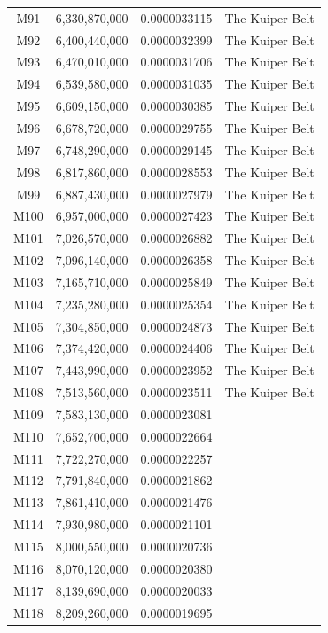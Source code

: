 \documentclass[11pt, a4paper]{article}
\begin{document}
\begin{longtable}{@{} c c c l @{}}
  M91 & 6,330,870,000 & 0.0000033115 & The Kuiper Belt \\
  M92 & 6,400,440,000 & 0.0000032399 & The Kuiper Belt \\
  M93 & 6,470,010,000 & 0.0000031706 & The Kuiper Belt \\
  M94 & 6,539,580,000 & 0.0000031035 & The Kuiper Belt \\
  M95 & 6,609,150,000 & 0.0000030385 & The Kuiper Belt \\
  M96 & 6,678,720,000 & 0.0000029755 & The Kuiper Belt \\
  M97 & 6,748,290,000 & 0.0000029145 & The Kuiper Belt \\
  M98 & 6,817,860,000 & 0.0000028553 & The Kuiper Belt \\
  M99 & 6,887,430,000 & 0.0000027979 & The Kuiper Belt \\
  M100 & 6,957,000,000 & 0.0000027423 & The Kuiper Belt \\
  M101 & 7,026,570,000 & 0.0000026882 & The Kuiper Belt \\
  M102 & 7,096,140,000 & 0.0000026358 & The Kuiper Belt \\
  M103 & 7,165,710,000 & 0.0000025849 & The Kuiper Belt \\
  M104 & 7,235,280,000 & 0.0000025354 & The Kuiper Belt \\
  M105 & 7,304,850,000 & 0.0000024873 & The Kuiper Belt \\
  M106 & 7,374,420,000 & 0.0000024406 & The Kuiper Belt \\
  M107 & 7,443,990,000 & 0.0000023952 & The Kuiper Belt \\
  M108 & 7,513,560,000 & 0.0000023511 & The Kuiper Belt \\
  M109 & 7,583,130,000 & 0.0000023081 &  \\
  M110 & 7,652,700,000 & 0.0000022664 &  \\
  M111 & 7,722,270,000 & 0.0000022257 &  \\
  M112 & 7,791,840,000 & 0.0000021862 &  \\
  M113 & 7,861,410,000 & 0.0000021476 &  \\
  M114 & 7,930,980,000 & 0.0000021101 &  \\
  M115 & 8,000,550,000 & 0.0000020736 &  \\
  M116 & 8,070,120,000 & 0.0000020380 &  \\
  M117 & 8,139,690,000 & 0.0000020033 &  \\
  M118 & 8,209,260,000 & 0.0000019695 &  \\

\end{longtable}
\end{document}
